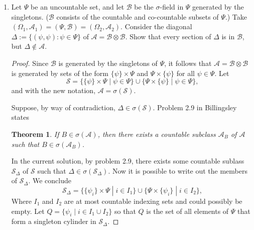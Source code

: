 \documentclass[letterpaper, 12pt]{article}
\newtheorem*{nthm}{Theorem}
\newcommand{\cA}{\mathcal{A}}
\newcommand{\sA}{\mathscr{A}}
\newcommand{\cB}{\mathcal{B}}
\newcommand{\cS}{\mathcal{S}}
\begin{document}
\begin{enumerate}
\begin{proof}
For the first part, notice
\begin{align*}
A_{\omega_1} 
&= \{\omega_2 \in \Omega_2 : (\omega_1, \omega_2) \in A \} \\
&= \{\omega_2 \in \Omega_2 : i_{\omega_1}(\omega_2) \in A\} \\
&= (i_{\omega_1})^{-1}(A) \\
&= i_{\omega_1}^{-1}(A)
\end{align*}
as desired. 
Also, for all $\omega_2 \in \Omega_2$ it is the case that 
\[
X_{\omega_1}(\omega_2) = X(\omega_1, \omega_2) = X(i_{\omega_1}(\omega_2)) = X \circ i_{\omega_1} (\omega_2)
\text{.}
\]
Hence $X_{\omega_1} = X \circ i_{\omega_1}$ as desired.
\end{proof}
\item
Let $\Psi$ be an uncountable set, and let $\cB$ be the $\sigma$-field in $\Psi$ generated by the singletons. 
($\cB$ consists of the countable and co-countable subsets of $\Psi$.) 
Take $(\Omega_1,\cA_1) = (\Psi,\cB) = (\Omega_2,\cA_2)$. 
Consider the diagonal $\Delta:=\{ (\psi,\psi):\psi\in\Psi \}$ of $\cA = \cB\otimes\cB$. 
Show that every section of $\Delta$ is in $\cB$, but $\Delta\notin\cA$.

\begin{proof}
Since $\cB$ is generated by the singletons of $\Psi$, it follows that $\cA = \cB\otimes\cB$ is generated by sets of the form $\{\psi\} \times \Psi$ and $\Psi \times \{\psi\}$ for all $\psi \in \Psi$. 
Let
\[
\cS = \{  \{\psi \} \times \Psi \; | \; \psi \in \Psi \} \cup \{ \Psi \times \{\psi \} \; | \; \psi \in \Psi \}
\text{,}
\]
and with the new notation, $\cA = \sigma(\cS)$.

Suppose, by way of contradiction, $\Delta \in \sigma(\cS)$.
Problem 2.9 in Billingsley states
\begin{nthm}
If $B \in \sigma(\sA)$, then there exists a countable subclass $\sA_B$ of $\sA$ such that $B \in \sigma(\sA_B)$.
\end{nthm}
In the current solution, by problem 2.9, there exists some countable sublass $\cS_\Delta$ of $\cS$ such that $\Delta \in \sigma(\cS_\Delta)$. 
Now it is possible to write out the members of $\cS_\Delta$. 
We conclude
\[
\cS_\Delta = \{ \{\psi_i\} \times \Psi \; | \; i \in I_1\} \cup \{ \Psi \times \{ \psi_i \} \;| \; i \in I_2 \}
\text{,}
\]
Where $I_1$ and $I_2$ are at most countable indexing sets and could possibly be empty. 
Let $Q = \{\psi_i \; | \;i \in I_1 \cup I_2\}$ so that $Q$ is the set of all elements of $\Psi$ that form a singleton cylinder in $\cS_\Delta$.


\end{proof}
\end{enumerate}
\end{document}
